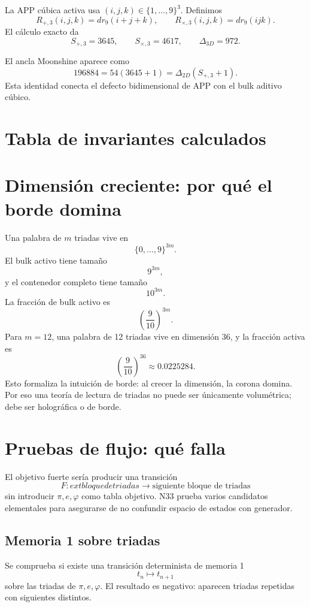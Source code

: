 \documentclass[11pt,a4paper]{article}
\begin{document}
La APP cúbica activa usa \((i,j,k)\in\{1,\ldots,9\}^3\). Definimos
\[
R_{+,3}(i,j,k)=dr_9(i+j+k),
\qquad
R_{\times,3}(i,j,k)=dr_9(ijk).
\]
El cálculo exacto da
\[
S_{+,3}=3645,
\qquad
S_{\times,3}=4617,
\qquad
\Delta_{3D}=972.
\]

El ancla Moonshine aparece como
\[
\boxed{196884=54(3645+1)=\Delta_{2D}(S_{+,3}+1).}
\]
Esta identidad conecta el defecto bidimensional de APP con el bulk aditivo cúbico.

\section{Tabla de invariantes calculados}
\begin{center}

\end{center}

\section{Dimensión creciente: por qué el borde domina}
Una palabra de \(m\) triadas vive en
\[
\{0,\ldots,9\}^{3m}.
\]
El bulk activo tiene tamaño
\[
9^{3m},
\]
y el contenedor completo tiene tamaño
\[
10^{3m}.
\]
La fracción de bulk activo es
\[
\left(\frac9{10}\right)^{3m}.
\]
Para \(m=12\), una palabra de 12 triadas vive en dimensión 36, y la fracción activa es
\[
\left(\frac9{10}\right)^{36}\approx 0.0225284.
\]
Esto formaliza la intuición de borde: al crecer la dimensión, la corona domina. Por eso una teoría de lectura de triadas no puede ser únicamente volumétrica; debe ser holográfica o de borde.

\section{Pruebas de flujo: qué falla}
El objetivo fuerte sería producir una transición
\[
F:	ext{bloque de triadas}\longrightarrow\text{siguiente bloque de triadas}
\]
sin introducir \(\pi,e,\varphi\) como tabla objetivo. N33 prueba varios candidatos elementales para asegurarse de no confundir espacio de estados con generador.

\subsection{Memoria 1 sobre triadas}
Se comprueba si existe una transición determinista de memoria 1
\[
t_n\mapsto t_{n+1}
\]
sobre las triadas de \(\pi,e,\varphi\). El resultado es negativo: aparecen triadas repetidas con siguientes distintos.
\end{document}
